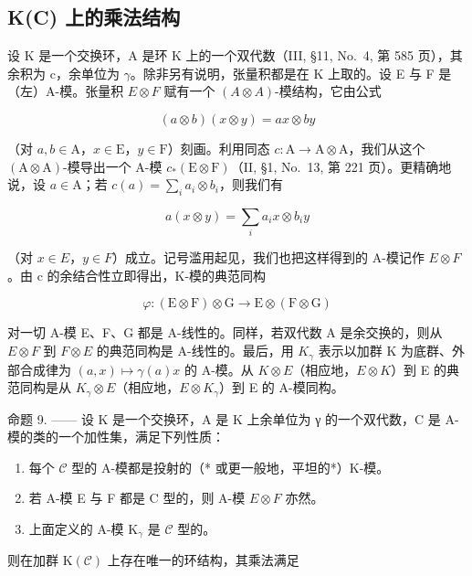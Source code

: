 \subsection{K(C) 上的乘法结构}

设 K 是一个交换环，A 是环 K 上的一个双代数（III, §11, No.~4, 第 585 页），其余积为 c，余单位为 \(\gamma\)。除非另有说明，张量积都是在 K 上取的。设 E 与 F 是（左）A-模。张量积 \(E \otimes F\) 赋有一个 \((A \otimes A)\)-模结构，它由公式

\[
(a \otimes b) (x \otimes y) = a x \otimes b y\tag{11}
\]

（对 \(a, b \in \mathrm{A}\)，\(x \in \mathrm{E}\)，\(y \in \mathrm{F}\)）刻画。利用同态 \(c: \mathrm{A} \to \mathrm{A} \otimes \mathrm{A}\)，我们从这个 \((\mathrm{A} \otimes \mathrm{A})\)-模导出一个 A-模 \(c_*(\mathrm{E} \otimes \mathrm{F})\)（II, §1, No.~13, 第 221 页）。更精确地说，设 \(a \in \mathrm{A}\)；若 \(c(a) = \sum_{i} a_{i} \otimes b_{i}\)，则我们有

\[
a (x \otimes y) = \sum_ {i} a _ {i} x \otimes b _ {i} y\tag{12}
\]

（对 \(x \in E\)，\(y \in F\)）成立。记号滥用起见，我们也把这样得到的 A-模记作 \(E \otimes F\)。由 c 的余结合性立即得出，K-模的典范同构

\[
\varphi : (\mathrm{E} \otimes \mathrm{F}) \otimes \mathrm{G} \longrightarrow \mathrm{E} \otimes (\mathrm{F} \otimes \mathrm{G})
\]

对一切 A-模 E、F、G 都是 A-线性的。同样，若双代数 A 是余交换的，则从 \(E \otimes F\) 到 \(F \otimes E\) 的典范同构是 A-线性的。最后，用 \(K_{\gamma}\) 表示以加群 K 为底群、外部合成律为 \((a, x) \mapsto \gamma(a)x\) 的 A-模。从 \(K \otimes E\)（相应地，\(E \otimes K\)）到 E 的典范同构是从 \(K_{\gamma} \otimes E\)（相应地，\(E \otimes K_{\gamma}\)）到 E 的 A-模同构。

命题 9. —— 设 K 是一个交换环，A 是 K 上余单位为 γ 的一个双代数，C 是 A-模的类的一个加性集，满足下列性质：

\begin{enumerate}
\def\labelenumi{(\roman{enumi})}
\item
  每个 \(\mathcal{C}\) 型的 A-模都是投射的（* 或更一般地，平坦的*）K-模。
\item
  若 A-模 E 与 F 都是 C 型的，则 A-模 \(E \otimes F\) 亦然。
\item
  上面定义的 A-模 \(\mathrm{K}_{\gamma}\) 是 \(\mathcal{C}\) 型的。
\end{enumerate}

则在加群 \(\mathrm{K}(\mathcal{C})\) 上存在唯一的环结构，其乘法满足

